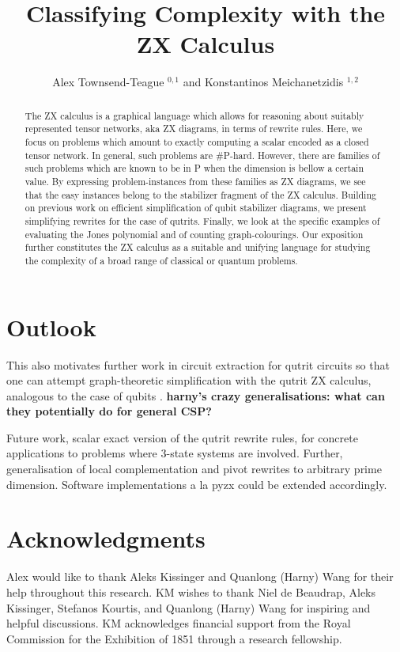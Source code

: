 \documentclass[submission,copyright,creativecommons]{eptcs}
\title{Classifying Complexity with the ZX Calculus}
\author{  Alex Townsend-Teague $^{0,1}$ and Konstantinos Meichanetzidis $^{1,2}$
\institute{$^0$ Mathematical Institute, University of Oxford}
\institute{$^1$ Department of Computer Science, University of Oxford}
\institute{$^2$ Cambridge Quantum Computing Ltd.} }
\begin{document}
\maketitle
\begin{abstract}
The ZX calculus is a graphical language which allows for reasoning about suitably represented tensor networks, aka ZX diagrams,
in terms of rewrite rules.
Here, we focus on problems which amount to exactly computing
a scalar encoded as a closed tensor network.
In general, such problems are \#P-hard.
However, there are families of such problems which are known to be in P
when the dimension is bellow a certain value.
By expressing problem-instances from these families as ZX diagrams,
we see that the easy instances belong to the stabilizer fragment of the ZX calculus.
Building on previous work on efficient simplification of qubit stabilizer diagrams, we present simplifying rewrites for the case of qutrits.
Finally, we look at the specific examples of evaluating the Jones polynomial
and of counting graph-colourings.
Our exposition further constitutes the ZX calculus as a suitable and unifying language for studying the complexity of
a broad range of classical or quantum problems.
\end{abstract}






\section{Outlook}

This also motivates further work in circuit extraction for qutrit circuits so that one can attempt graph-theoretic simplification with the qutrit ZX calculus, analogous to the case of qubits \cite{graph_theoretic_simplification,backens2020again}.
{\bf harny's crazy generalisations: what can they potentially do for general CSP?}

Future work, scalar exact version of the qutrit rewrite rules,
for concrete applications to problems where $3$-state systems are involved.
Further,
generalisation of local complementation and pivot rewrites to arbitrary prime dimension.
Software implementations a la pyzx could be extended accordingly.

\section{Acknowledgments}
Alex would like to thank Aleks Kissinger and Quanlong (Harny) Wang for their help throughout this research.
KM wishes to thank Niel de Beaudrap, Aleks Kissinger, Stefanos 
Kourtis, and Quanlong (Harny) Wang for inspiring and helpful discussions.
KM acknowledges financial support from the Royal Commission for the Exhibition of 1851 through a research fellowship.
\end{document}
